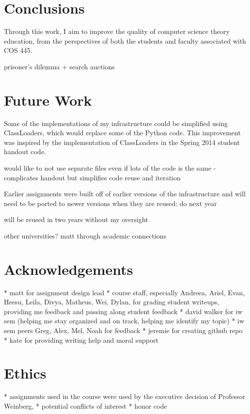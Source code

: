 \documentclass[pageno]{jpaper}
\begin{document}
\section*{Conclusions}
Through this work, I aim to improve the quality of computer science theory education, from the perspectives of both the students and faculty associated with COS 445.

prisoner's dilemma + search auctions



\section*{Future Work}

Some of the implementations of my infrastructure could be simplified using ClassLoaders, which would replace some of the Python code.
This improvement was inspired by the implementation of ClassLoaders in the Spring 2014 student handout code.

would like to not use separate files even if lots of the code is the same - complicates handout but simplifies code reuse and iteration

Earlier assignments were built off of earlier versions of the infrastructure and will need to be ported to newer versions when they are reused: do next year

will be reused in two years without my oversight

other universities? matt through academic connections

\section*{Acknowledgements}
* matt for assignment design lead
* course staff, especially Andreea, Ariel, Evan, Heesu, Leila, Divya, Matheus, Wei, Dylan, for grading student writeups, providing me feedback and passing along student feedback
* david walker for iw sem (helping me stay organized and on track, helping me identify my topic)
* iw sem peers Greg, Alex, Mel, Noah for feedback
* jeremie for creating github repo
* kate for providing writing help and moral support

\section*{Ethics}
* assignments used in the course were used by the executive decision of Professor Weinberg,
* potential conflicts of interest
* honor code
\end{document}

